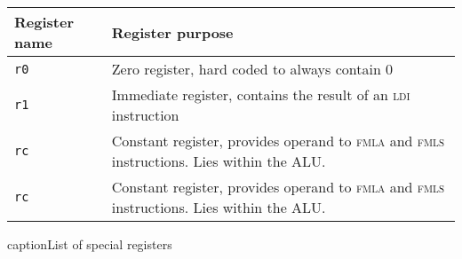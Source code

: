 \begin{centering}[H]
	\centering
	\begin{tabular}{|l p{10.5cm}|}
		\hline
		\textbf{Register name} & \textbf{Register purpose} \\
		\hline
		\texttt{r0} & Zero register, hard coded to always contain 0 \\
		\texttt{r1} & Immediate register, contains the result of an \textsc{ldi} instruction\\
		\texttt{rc} & Constant register, provides operand to \textsc{fmla} and \textsc{fmls} instructions. Lies within the ALU. \\
		\texttt{rc} & Constant register, provides operand to \textsc{fmla} and \textsc{fmls} instructions. Lies within the ALU. \\
		\hline
	\end{tabular}
	caption{List of special registers}
	\label{tab:specregs}
\end{centering}

